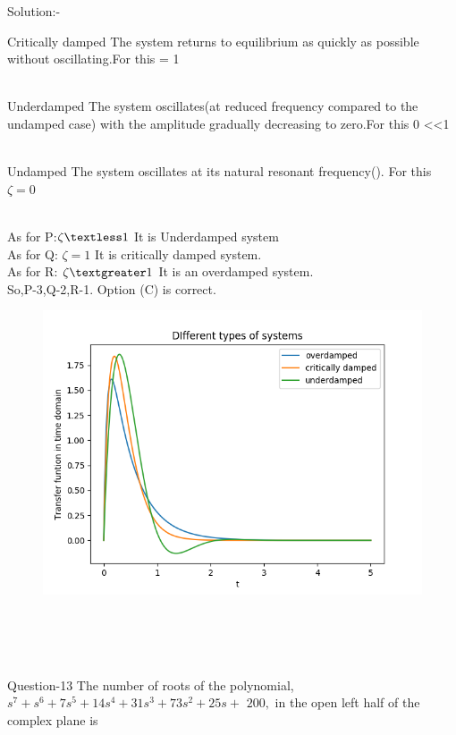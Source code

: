 \documentclass[journal,12pt,twocolumn]{IEEEtran}
\begin{document}
\begin{frame}{Solution:- }
\begin{frame}{}
\begin{block}{Critically damped}
The system returns to equilibrium as quickly as possible without oscillating.For this \zeta = 1 \\\\
\end{block}
\end{frame}
\begin{frame}{}
\begin{block}{Underdamped}
The system oscillates(at reduced frequency compared to the undamped case) with the amplitude gradually decreasing to zero.For this 0 \textless\zeta\textless1
\\\\
\end{block}
\begin{block}{Undamped}
The system oscillates at its natural resonant frequency(). For this $\zeta=0$
\\\\
\end{block}    
\end{frame}
\begin{frame}{}
 As for P:$\zeta \textless 1$
It is Underdamped system\\
As for Q: $\zeta =1$
It is critically damped system.\\
 As for R: $\zeta \textgreater 1$
It is an overdamped system.\\
\vspace{10mm}
So,P-3,Q-2,R-1. Option (C) is correct.
\end{frame}
\begin{frame}{}
\begin{figure}
    \centering
    \includegraphics[width=1.1\linewidth]{./figs/Damping.png}
\end{figure}
\end{frame}
\\\\\\
\begin{frame}{Question-13 }
The number of roots of the polynomial, $s^{7}+s^{6}+7 s^{5}+14 s^{4}+31s^{3}+73 s^{2}+25 s+$ $200,$ in the open left half of the complex plane is


\end{frame}
\end{frame}
\end{document}
